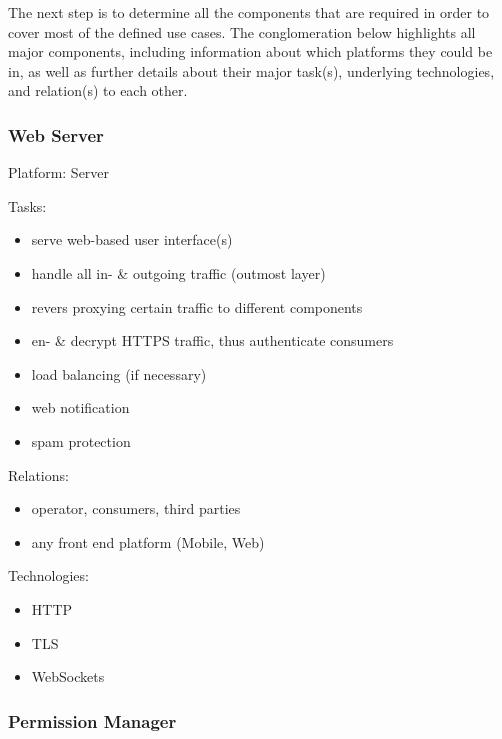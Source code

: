 \documentclass[12pt,english,a4paper,titlepage,cleardoublepage=empty,dottedtoc]{report}
\providecommand{\tightlist}{%
  \setlength{\itemsep}{0pt}\setlength{\parskip}{0pt}}
\begin{document}
The next step is to determine all the components that are required in
order to cover most of the defined use cases. The conglomeration below
highlights all major components, including information about which
platforms they could be in, as well as further details about their major
task(s), underlying technologies, and relation(s) to each other.

\subsubsection*{Web Server}\label{web-server}

Platform: Server

Tasks:

\begin{itemize}
\tightlist
\item
  serve web-based user interface(s)
\item
  handle all in- \& outgoing traffic (outmost layer)
\item
  revers proxying certain traffic to different components
\item
  en- \& decrypt HTTPS traffic, thus authenticate consumers
\item
  load balancing (if necessary)
\item
  web notification
\item
  spam protection
\end{itemize}

Relations:

\begin{itemize}
\tightlist
\item
  operator, consumers, third parties
\item
  any front end platform (Mobile, Web)
\end{itemize}

Technologies:

\begin{itemize}
\tightlist
\item
  HTTP
\item
  TLS
\item
  WebSockets
\end{itemize}

\subsubsection*{Permission Manager}\label{permission-manager}
\end{document}

